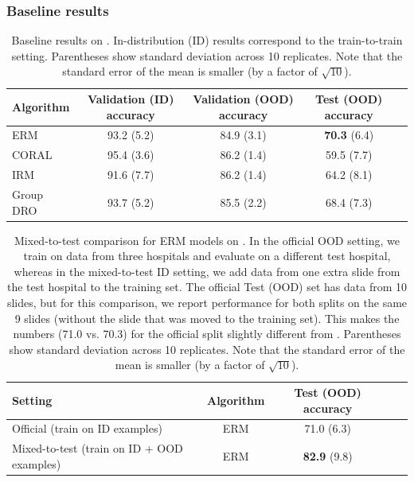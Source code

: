 \subsubsection{Baseline results}

\begin{table}[!t]
  \caption{Baseline results on \Camelyon. In-distribution (ID) results correspond to the train-to-train setting. Parentheses show standard deviation across 10 replicates. Note that the standard error of the mean is smaller (by a factor of $\sqrt{10}$).
  }
  \label{tab:results_camelyon}
  \centering
  \begin{tabular}{lcccc}
  \toprule
  Algorithm & Validation (ID) accuracy & Validation (OOD) accuracy & Test (OOD) accuracy\\
  \midrule
  ERM        & 93.2 (5.2) & 84.9 (3.1) & \textbf{70.3} (6.4)\\
  CORAL      & 95.4 (3.6) & 86.2 (1.4) & 59.5 (7.7)\\
  IRM        & 91.6 (7.7) & 86.2 (1.4) & 64.2 (8.1)\\
  Group DRO  & 93.7 (5.2) & 85.5 (2.2) & 68.4 (7.3)\\
  \bottomrule
  \end{tabular}
\end{table}

\begin{table}[!t]
  \caption{Mixed-to-test comparison for ERM models on \Camelyon.
  In the official OOD setting, we train on data from three hospitals and evaluate on a different test hospital, whereas in the mixed-to-test ID setting,
  we add data from one extra slide from the test hospital to the training set.
  The official Test (OOD) set has data from 10 slides, but for this comparison, we report performance for both splits on the same 9 slides (without the slide that was moved to the training set).
  This makes the numbers (71.0 vs. 70.3) for the official split slightly different from .
  Parentheses show standard deviation across 10 replicates.
  Note that the standard error of the mean is smaller (by a factor of $\sqrt{10}$).
  }
  \label{tab:drop_camelyon}
  \centering
  \begin{tabular}{lcccc}
  \toprule
  Setting                                       & Algorithm & Test (OOD) accuracy\\
  \midrule
  Official      (train on ID examples)        & ERM       & 71.0 (6.3)\\
  Mixed-to-test (train on ID + OOD examples)  & ERM       & \textbf{82.9} (9.8)\\
  \bottomrule
  \end{tabular}
\end{table}

